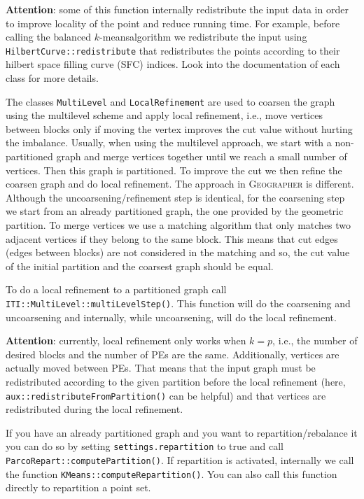 \documentclass[a4paper,10pt]{article}
\newcommand{\geo}{\textsc{Geographer} }
\newcommand{\km}{$k$-means}
\newcommand{\att}{\textbf{Attention}: }
\newcommand{\MI}[1]{\texttt{#1}}
\begin{document}
\att some of this function internally redistribute the input data in order to improve locality of the
point and reduce running time. For example, before calling the balanced \km algorithm we redistribute
the input using \MI{HilbertCurve::redistribute} that redistributes the points according to their
hilbert space filling curve (SFC) indices. Look into the documentation of each class for more details.

The classes \MI{MultiLevel} and  \MI{LocalRefinement} are used to coarsen the graph using the
multilevel scheme and apply local refinement, i.e., move vertices between blocks only if moving
the vertex improves the cut value without hurting the imbalance.
Usually, when using the multilevel approach, we start with a non-partitioned graph and merge vertices
together until we reach a small number of vertices. Then this graph is partitioned. To improve
the cut we then refine the coarsen graph and do local refinement. The approach in \geo is different.
Although the uncoarsening/refinement step is identical, for the coarsening step we start from an
already partitioned graph, the one provided by the geometric partition. To merge vertices we
use a matching algorithm that only matches two adjacent vertices if they belong to the same block.
This means that cut edges (edges between blocks) are not considered in the matching and so, the cut 
value of the initial partition and the coarsest graph should be equal.

To do a local refinement to a partitioned graph call \MI{ITI::MultiLevel::multiLevelStep()}. 
This function will do the coarsening and uncoarsening and internally, while uncoarsening,
will do the local refinement.

\att currently, local refinement only works when $k=p$, i.e., the number of desired blocks and the
number of PEs are the same. Additionally, vertices are actually moved between PEs. That means
that the input graph must be redistributed according to the given partition before the local refinement
(here, \MI{aux::redistributeFromPartition()} can be helpful)
and that vertices are redistributed during the local refinement.

If you have an already partitioned graph and you want to repartition/rebalance it you can do
so by setting \MI{settings.repartition} to true and call \MI{ParcoRepart::computePartition()}.
If repartition is activated, internally we call the function \MI{KMeans::computeRepartition()}.
You can also call this function directly to repartition a point set.
\end{document}
